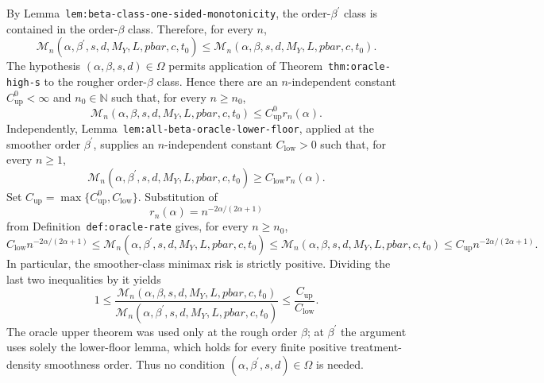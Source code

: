 By Lemma~\texttt{lem:beta-class-one-sided-monotonicity}, the order-\(\beta^{\prime}\) class is contained in the order-\(\beta\) class. Therefore, for every \(n\),
\[
\mathcal M_n(\alpha,\beta^{\prime},s,d,M_Y,L,pbar,c,t_0)
\le
\mathcal M_n(\alpha,\beta,s,d,M_Y,L,pbar,c,t_0).
\]
The hypothesis \((\alpha,\beta,s,d)\in\Omega\) permits application of Theorem~\texttt{thm:oracle-high-s} to the rougher order-\(\beta\) class. Hence there are an \(n\)-independent constant \(C_{\mathrm{up}}^{0}<\infty\) and \(n_0\in\mathbb N\) such that, for every \(n\ge n_0\),
\[
\mathcal M_n(\alpha,\beta,s,d,M_Y,L,pbar,c,t_0)
\le C_{\mathrm{up}}^{0}r_n(\alpha).
\]
Independently, Lemma~\texttt{lem:all-beta-oracle-lower-floor}, applied at the smoother order \(\beta^{\prime}\), supplies an \(n\)-independent constant \(C_{\mathrm{low}}>0\) such that, for every \(n\ge1\),
\[
\mathcal M_n(\alpha,\beta^{\prime},s,d,M_Y,L,pbar,c,t_0)
\ge C_{\mathrm{low}}r_n(\alpha).
\]
Set \(C_{\mathrm{up}}=\max\{C_{\mathrm{up}}^{0},C_{\mathrm{low}}\}\). Substitution of
\[
r_n(\alpha)=n^{-2\alpha/(2\alpha+1)}
\]
from Definition~\texttt{def:oracle-rate} gives, for every \(n\ge n_0\),
\[
C_{\mathrm{low}}n^{-2\alpha/(2\alpha+1)}
\le \mathcal M_n(\alpha,\beta^{\prime},s,d,M_Y,L,pbar,c,t_0)
\le \mathcal M_n(\alpha,\beta,s,d,M_Y,L,pbar,c,t_0)
\le C_{\mathrm{up}}n^{-2\alpha/(2\alpha+1)}.
\]
In particular, the smoother-class minimax risk is strictly positive. Dividing the last two inequalities by it yields
\[
1\le
\frac{\mathcal M_n(\alpha,\beta,s,d,M_Y,L,pbar,c,t_0)}
{\mathcal M_n(\alpha,\beta^{\prime},s,d,M_Y,L,pbar,c,t_0)}
\le \frac{C_{\mathrm{up}}}{C_{\mathrm{low}}}.
\]
The oracle upper theorem was used only at the rough order \(\beta\); at \(\beta^{\prime}\) the argument uses solely the lower-floor lemma, which holds for every finite positive treatment-density smoothness order. Thus no condition \((\alpha,\beta^{\prime},s,d)\in\Omega\) is needed.